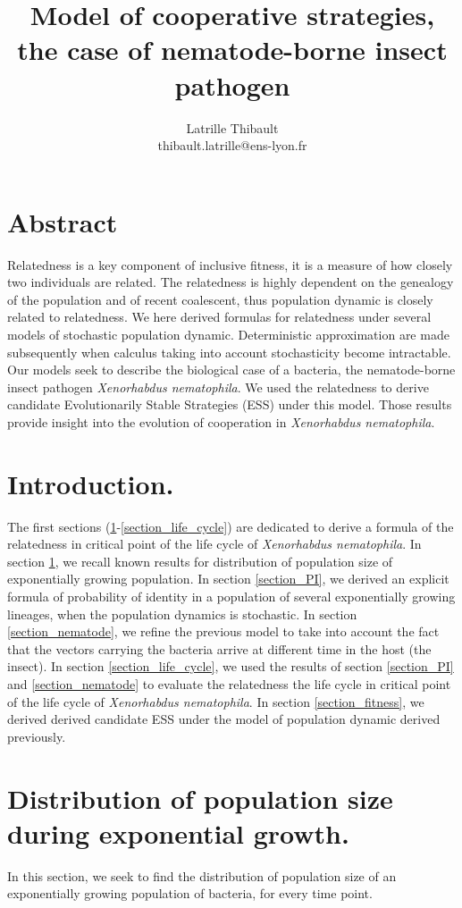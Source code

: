\documentclass{article}
\author{Latrille Thibault\\
\small thibault.latrille@ens-lyon.fr\\[-0.8ex]}
\title{Model of cooperative strategies, the case of nematode-borne insect
pathogen \Xnema}
\newcommand{\Xnema}{\textit{Xenorhabdus nematophila}}
\begin{document}
%
\maketitle

\section*{Abstract}
Relatedness is a key component of inclusive fitness, it is a measure of how closely two individuals are related. The relatedness is highly dependent on the genealogy of the population and of recent coalescent, thus population dynamic is closely related to relatedness. We here derived formulas for relatedness under several models of stochastic population dynamic. Deterministic approximation are made subsequently when calculus taking into account stochasticity become intractable. Our models seek to describe the biological case of a bacteria, the nematode-borne insect pathogen \Xnema. 
We used the relatedness to derive candidate Evolutionarily Stable Strategies (ESS) under this model. Those results provide insight into the evolution of cooperation in \Xnema.

\section*{Introduction.}
The first sections (\ref{section_exp_growth}-\ref{section_life_cycle}) are dedicated to derive a formula of the relatedness in critical point of the life cycle of \Xnema. 
In section \ref{section_exp_growth}, we recall known results for distribution of population size of exponentially growing population.
In section \ref{section_PI}, we derived an explicit formula of probability of identity in a population of several exponentially growing lineages, when the population dynamics is stochastic.
In section \ref{section_nematode}, we refine the previous model to take into account the fact that the vectors carrying the bacteria arrive at different time in the host (the insect).
In section \ref{section_life_cycle}, we used the results of section \ref{section_PI} and \ref{section_nematode} to evaluate the relatedness the life cycle in critical point of the life cycle of \Xnema. 
In section \ref{section_fitness}, we derived derived candidate ESS under the model of population dynamic derived previously.

\section{Distribution of population size during exponential growth.}
\label{section_exp_growth}
In this section, we seek to find the distribution of population size of an exponentially growing population of bacteria, for every time point. 
\end{document}
